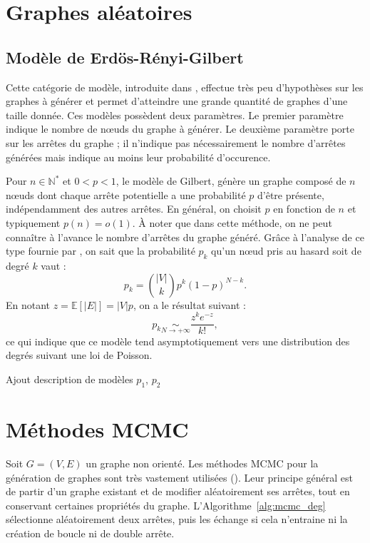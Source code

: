 \documentclass[a4paper]{article}
\begin{document}
\section{Graphes aléatoires}
\label{sec:graphes_aleatoires}

    \subsection{Modèle de Erdös-Rényi-Gilbert}
    \label{sub:modele_erdos}
    Cette catégorie de modèle, introduite dans \cite{erdHos1960evolution},
    effectue très peu d'hypothèses sur les graphes à générer et permet
    d'atteindre une grande quantité de graphes d'une taille donnée. Ces modèles
    possèdent deux paramètres. Le premier paramètre indique le nombre de
    n\oe{}uds du graphe à générer. Le deuxième paramètre porte sur les arrêtes
    du graphe ; il n'indique pas nécessairement le nombre d'arrêtes générées
    mais indique au moins leur probabilité d'occurence.

    Pour $n \in \mathbb{N}^*$ et $0 < p < 1$, le modèle de Gilbert,
    génère un graphe composé de $n$ n\oe{}uds dont chaque arrête
    potentielle a une probabilité $p$ d'être présente, indépendamment
    des autres arrêtes.
    En général, on choisit $p$ en fonction de $n$ et typiquement
    $p(n) = o(1)$. \`A noter que dans cette méthode, on ne peut
    connaître à l'avance le nombre d'arrêtes du graphe généré.
    Gr\^ace à l'analyse de ce type fournie par \cite{newman2001random},
    on sait que la probabilité $p_k$ qu'un n\oe{}ud pris au hasard
    soit de degré $k$ vaut :
    \[
        p_k = \binom{|V|}{k} p^k (1 - p)^{N - k}.
    \]
    En notant $z = \mathbb{E}\left[|E|\right] = |V|p$, on a le résultat
    suivant :
    \[
        p_k \underset{N \rightarrow +\infty}{\sim}
        \frac{z^k e^{-z}}{k!},
    \]
    ce qui indique que ce modèle tend asymptotiquement vers une
    distribution des degrés suivant une loi de Poisson.

\begin{todo}
Ajout description de modèles $p_1$, $p_2$
\end{todo}

\section{Méthodes MCMC}
\label{sec:methodes_mcmc}
    Soit $G = (V, E)$ un graphe non orienté.
    Les méthodes MCMC pour la génération de graphes sont très vastement
    utilisées (\cite{rao1996markov}). Leur principe général est de partir
    d'un graphe existant et de modifier aléatoirement ses arrêtes, tout en
    conservant certaines propriétés du graphe. L'Algorithme~\ref{alg:mcmc_deg}
    sélectionne aléatoirement deux arrêtes, puis les échange si cela
    n'entraine ni la création de boucle ni de double arrête.
\end{document}
